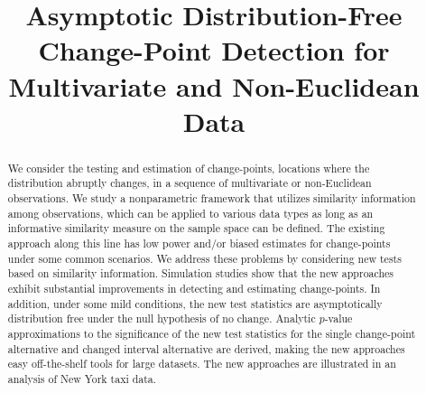 \documentclass[arxiv, preprint]{imsart}
\numberwithin{equation}{section}
\theoremstyle{plain}
\begin{document}
\newcommand{\boldE}{\mathbf{E}}
\newcommand{\boldP}{\mathbf{P}}
\newcommand{\red}{\textcolor{red}}
\newcommand{\by}{\mathbf{y}}


\begin{frontmatter}
\title{Asymptotic Distribution-Free Change-Point Detection for Multivariate and Non-Euclidean Data }


\begin{abstract}
We consider the testing and estimation of change-points, locations where the distribution abruptly changes, in a sequence of multivariate or non-Euclidean observations.  We study a nonparametric framework that utilizes similarity information among observations, which can be applied to various data types as long as an informative similarity measure on the sample space can be defined.  The existing approach along this line has low power and/or biased estimates for change-points under some common scenarios.  We address these problems by considering new tests based on similarity information.  Simulation studies show that the new approaches exhibit substantial improvements in detecting and estimating change-points. In addition, under some mild conditions, the new test statistics are asymptotically distribution free under the null hypothesis of no change. Analytic $p$-value approximations to the significance of the new test statistics for the single change-point alternative and changed interval alternative are derived, making the new approaches easy off-the-shelf tools for large datasets. The new approaches are illustrated in an analysis of New York taxi data. 
\end{abstract}


\end{frontmatter}
\end{document}
